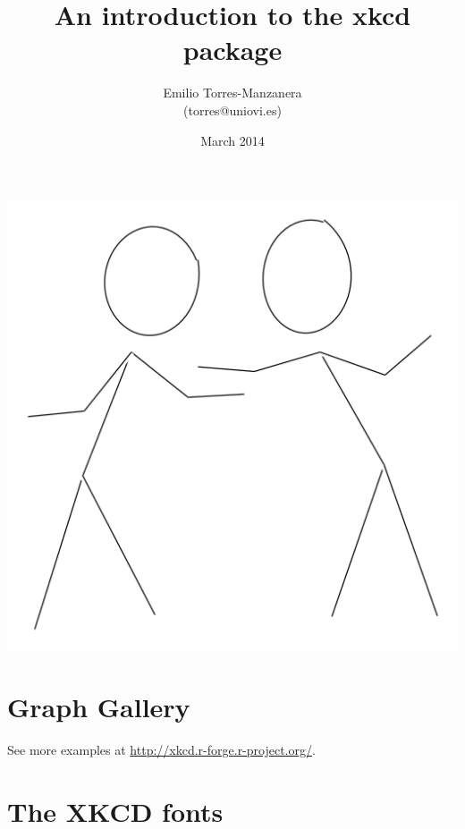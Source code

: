 \documentclass[10pt]{article}
\title{An introduction to the xkcd package}
\author{Emilio Torres-Manzanera\\ (torres@uniovi.es)}
\date{March 2014}
\begin{document}




\maketitle

\begin{abstract}
    
    \end{abstract}

\begin{center}
\includegraphics{xkcd-intro-twoman}

\end{center}
\tableofcontents

\bigskip
\section{Graph Gallery}

See more examples at \url{http://xkcd.r-forge.r-project.org/}.

\section{The XKCD fonts}
\end{document}
